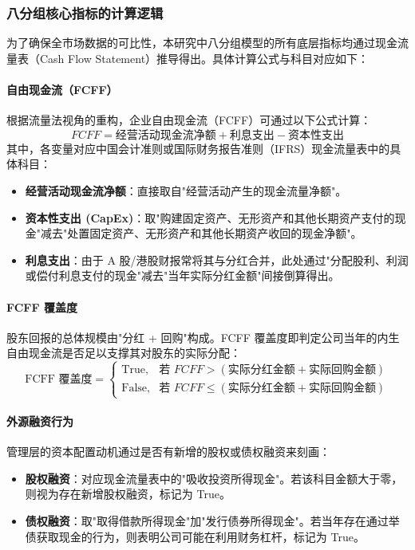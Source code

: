 \documentclass[a4paper,10pt]{article}
\begin{document}
\subsubsection{八分组核心指标的计算逻辑}

为了确保全市场数据的可比性，本研究中八分组模型的所有底层指标均通过现金流量表（Cash Flow Statement）推导得出。具体计算公式与科目对应如下：

\paragraph{自由现金流（FCFF）}
根据流量法视角的重构，企业自由现金流（FCFF）可通过以下公式计算：
\begin{equation}
FCFF = \text{经营活动现金流净额} + \text{利息支出} - \text{资本性支出}
\end{equation}
其中，各变量对应中国会计准则或国际财务报告准则（IFRS）现金流量表中的具体科目：
\begin{itemize}
    \item \textbf{经营活动现金流净额}：直接取自"经营活动产生的现金流量净额"。
    \item \textbf{资本性支出 (CapEx)}：取"购建固定资产、无形资产和其他长期资产支付的现金"减去"处置固定资产、无形资产和其他长期资产收回的现金净额"。
    \item \textbf{利息支出}：由于 A 股/港股财报常将其与分红合并，此处通过"分配股利、利润或偿付利息支付的现金"减去"当年实际分红金额"间接倒算得出。
\end{itemize}

\paragraph{FCFF 覆盖度}
股东回报的总体规模由"分红 + 回购"构成。FCFF 覆盖度即判定公司当年的内生自由现金流是否足以支撑其对股东的实际分配：
\begin{equation}
\text{FCFF 覆盖度} =
\begin{cases}
\text{True},  & \text{若 } FCFF > (\text{实际分红金额} + \text{实际回购金额}) \\
\text{False}, & \text{若 } FCFF \le (\text{实际分红金额} + \text{实际回购金额})
\end{cases}
\end{equation}

\paragraph{外源融资行为}
管理层的资本配置动机通过是否有新增的股权或债权融资来刻画：
\begin{itemize}
    \item \textbf{股权融资}：对应现金流量表中的"吸收投资所得现金"。若该科目金额大于零，则视为存在新增股权融资，标记为 True。
    \item \textbf{债权融资}：取"取得借款所得现金"加"发行债券所得现金"。若当年存在通过举债获取现金的行为，则表明公司可能在利用财务杠杆，标记为 True。
\end{itemize}
\end{document}
